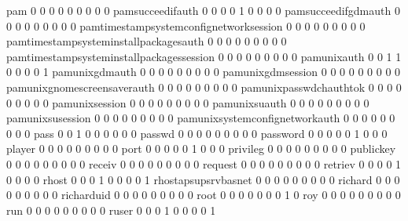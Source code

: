 \documentclass[compress,8pt]{beamer}
\begin{document}
\begin{frame}
\begin{Schunk}
  pam                                        0   0   0   0   0   0   0   0   0
  pamsucceedifauth                           0   0   0   0   1   0   0   0   0
  pamsucceedifgdmauth                        0   0   0   0   0   0   0   0   0
  pamtimestampsystemconfignetworksession     0   0   0   0   0   0   0   0   0
  pamtimestampsysteminstallpackagesauth      0   0   0   0   0   0   0   0   0
  pamtimestampsysteminstallpackagessession   0   0   0   0   0   0   0   0   0
  pamunixauth                                0   0   1   1   0   0   0   0   1
  pamunixgdmauth                             0   0   0   0   0   0   0   0   0
  pamunixgdmsession                          0   0   0   0   0   0   0   0   0
  pamunixgnomescreensaverauth                0   0   0   0   0   0   0   0   0
  pamunixpasswdchauthtok                     0   0   0   0   0   0   0   0   0
  pamunixsession                             0   0   0   0   0   0   0   0   0
  pamunixsuauth                              0   0   0   0   0   0   0   0   0
  pamunixsusession                           0   0   0   0   0   0   0   0   0
  pamunixsystemconfignetworkauth             0   0   0   0   0   0   0   0   0
  pass                                       0   0   1   0   0   0   0   0   0
  passwd                                     0   0   0   0   0   0   0   0   0
  password                                   0   0   0   0   0   1   0   0   0
  player                                     0   0   0   0   0   0   0   0   0
  port                                       0   0   0   0   0   1   0   0   0
  privileg                                   0   0   0   0   0   0   0   0   0
  publickey                                  0   0   0   0   0   0   0   0   0
  receiv                                     0   0   0   0   0   0   0   0   0
  request                                    0   0   0   0   0   0   0   0   0
  retriev                                    0   0   0   0   1   0   0   0   0
  rhost                                      0   0   0   1   0   0   0   0   1
  rhostapsupsrvbasnet                        0   0   0   0   0   0   0   0   0
  richard                                    0   0   0   0   0   0   0   0   0
  richarduid                                 0   0   0   0   0   0   0   0   0
  root                                       0   0   0   0   0   0   0   1   0
  roy                                        0   0   0   0   0   0   0   0   0
  run                                        0   0   0   0   0   0   0   0   0
  ruser                                      0   0   0   1   0   0   0   0   1

\end{Schunk}
\end{frame}
\end{document}
